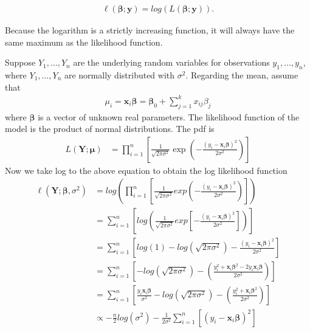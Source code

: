 \begin{align*}
    \ell(\boldsymbol{\beta};\textbf{y})=log(L(\boldsymbol{\beta}; \textbf{y})).
\end{align*}

Because the logarithm is a strictly increasing function, it will always have the same maximum as the likelihood function. 

\begin{example} \label{ex:model1}
Suppose $Y_1,\ldots,Y_n$ are the underlying random variables for observations $y_1,\ldots,y_n$, where $Y_1,\ldots,Y_n$ are normally distributed with $\sigma^2$. Regarding the mean, assume that
\begin{align*}
    \mu_i = \textbf{x}_i\boldsymbol{\beta}= \boldsymbol{\beta}_0 + \sum_{j=1}^k x_{ij}\beta_j
\end{align*}
where $\boldsymbol{\beta}$ is a vector of unknown real parameters. 
The likelihood function of the model is the product of normal distributions. The pdf is 
\begin{align*}
   L(\textbf{Y};\boldsymbol{\mu}) &= \prod_{i=1}^n \left[ \frac{1}{ \sqrt{2 \pi\sigma^2}}\exp\left(-\frac{(y_i -\textbf{x}_i\boldsymbol{\beta})^2}{2\sigma^2}\right) \right]
\end{align*}
Now we take log to the above equation to obtain the log likelihood function
\begin{align*}
   \ell(\textbf{Y};\boldsymbol{\beta}, \sigma^2) &= log \left( \prod_{i=1}^n \left[ \frac{1}{\sqrt{2 \pi \sigma^2}}exp\left(-\frac{(y_i -\textbf{x}_i\boldsymbol{\beta})^2}{2\sigma^2}\right) \right] \right)\\
   &= \sum_{i = 1}^n \left[ log\left( \frac{1}{\sqrt{2 \pi \sigma^2}}exp\left[-\frac{(y_i - \textbf{x}_i\boldsymbol{\beta})^2}{2\sigma^2}\right] \right) \right]\\
   &= \sum_{i = 1}^n \left[ log(1) - log(\sqrt{2 \pi \sigma^2}) - \frac{(y_i - \textbf{x}_i\boldsymbol{\beta})^2}{2\sigma^2} \right]\\
   &= \sum_{i = 1}^n \left[- log\left( \sqrt{2 \pi \sigma^2}\right) - \left(\frac{y_i^2 + \textbf{x}_i\boldsymbol{\beta}^2 - 2y_i\textbf{x}_i\boldsymbol{\beta}}{2 \sigma^2}\right) \right]\\
   &= \sum_{i = 1}^n \left[\frac{y_i \textbf{x}_i\boldsymbol{\beta}}{\sigma^2} - log\left( \sqrt{2 \pi \sigma^2}\right) - \left( \frac{y_i^2 + \textbf{x}_i\boldsymbol{\beta}^2}{2\sigma^2} \right) \right] \\
   &\propto - \frac{n}{2}log( \sigma^2) - \frac{1}{2\sigma^2} \sum_{i = 1}^n \left[(y_i -\textbf{x}_i\boldsymbol{\beta})^2  \right]
\end{align*}
\end{example}
